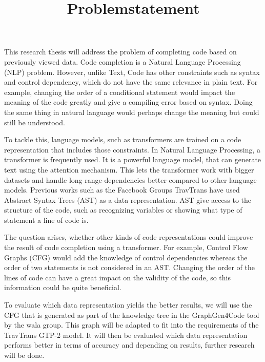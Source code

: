 \documentclass[12pt]{tudapub}
\title{Problemstatement}
\begin{document}
\maketitle
This research thesis will address the problem of completing code based on previously viewed data. Code completion is a Natural Language Processing (NLP) problem. However, unlike Text, Code has other constraints such as syntax and control dependency, which do not have the same relevance in plain text. For example, changing the order of a conditional statement would impact the meaning of the code greatly and give a compiling error based on syntax. Doing the same thing in natural language would perhaps change the meaning but could still be understood.
\par
To tackle this, language models, such as transformers are trained on a code representation that includes those constraints.
In Natural Language Processing, a transformer is frequently used. It is a powerful language model, that can generate text using the attention mechanism. This lets the transformer work with bigger datasets  and handle long range-dependencies better compared to other language models.
Previous works such as the Facebook Groups TravTrans have used Abstract Syntax Trees (AST) as a data representation. AST give access to the structure of the code, such as recognizing variables or showing what type of statement a line of code is.
\par
The question arises, whether other kinds of code representations could improve the result of code completion using a transformer. For example, Control Flow Graphs (CFG) would add the knowledge of control dependencies whereas the order of two statements is not considered in an AST. Changing the order of the lines of code can have a great impact on the validity of the code, so this information could be quite beneficial. 
\par
To evaluate which data representation yields the better results, we will use the CFG that is generated as part of the knowledge tree in the GraphGen4Code tool by the wala group. This graph will be adapted to fit into the requirements of the TravTrans GTP-2 model.
 It will then be evaluated which data representation performs better in terms of accuracy and depending on results, further research will be done.
\end{document}
